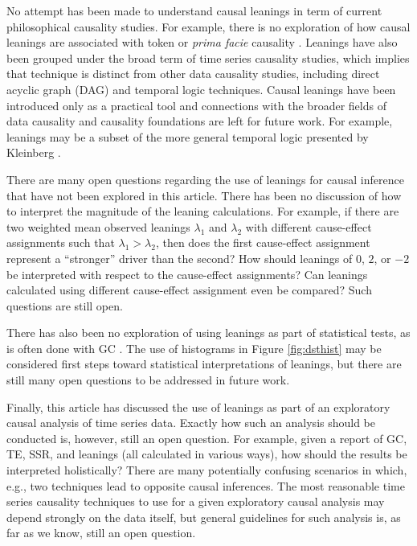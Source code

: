 \documentclass[a4paper,11pt,twocolumn]{article}
\begin{document}
No attempt has been made to understand causal leanings in term of current philosophical causality studies.   For example, there is no exploration of how causal leanings are associated with token or {\em prima facie} causality \cite{kleinberg2012}.  Leanings have also been grouped under the broad term of time series causality studies, which implies that technique is distinct from other data causality studies, including direct acyclic graph (DAG) \cite{Pearl2000} and temporal logic \cite{kleinberg2012} techniques.  Causal leanings have been introduced only as a practical tool and connections with the broader fields of data causality and causality foundations are left for future work.  For example, leanings may be a subset of the more general temporal logic presented by Kleinberg \cite{kleinberg2012}.

There are many open questions regarding the use of leanings for causal inference that have not been explored in this article.  There has been no discussion of how to interpret the magnitude of the leaning calculations.  For example, if there are two weighted mean observed leanings $\lambda_1$ and $\lambda_2$ with different cause-effect assignments such that $\lambda_1 > \lambda_2$, then does the first cause-effect assignment represent a ``stronger'' driver than the second?  How should leanings of $0$, $2$, or $-2$ be interpreted with respect to the cause-effect assignments?  Can leanings calculated using different cause-effect assignment even be compared?  Such questions are still open.

There has also been no exploration of using leanings as part of statistical tests, as is often done with GC \cite{Pierce1977}.  The use of histograms in Figure \ref{fig:dsthist} may be considered first steps toward statistical interpretations of leanings, but there are still many open questions to be addressed in future work.

Finally, this article has discussed the use of leanings as part of an exploratory causal analysis of time series data.  Exactly how such an analysis should be conducted is, however, still an open question.  For example, given a report of GC, TE, SSR, and leanings (all calculated in various ways), how should the results be interpreted holistically?  There are many potentially confusing scenarios in which, e.g., two techniques lead to opposite causal inferences.  The most reasonable time series causality techniques to use for a given exploratory causal analysis may depend strongly on the data itself, but general guidelines for such analysis is, as far as we know, still an open question.




\end{document}
